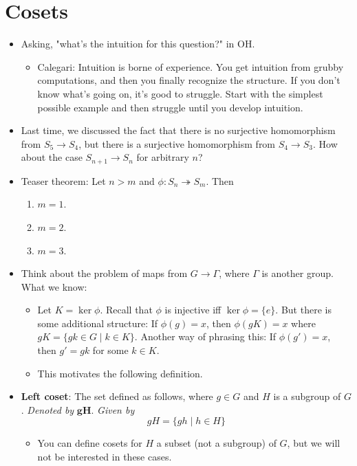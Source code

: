 \documentclass[../notes.tex]{subfiles}
\begin{document}
\section{Cosets}
\begin{itemize}
    \item {}Asking, "what's the intuition for this question?" in OH.
    \begin{itemize}
        \item Calegari: Intuition is borne of experience. You get intuition from grubby computations, and then you finally recognize the structure. If you don't know what's going on, it's good to struggle. Start with the simplest possible example and then struggle until you develop intuition.
    \end{itemize}
    \item Last time, we discussed the fact that there is no surjective homomorphism from $S_5\to S_4$, but there is a surjective homomorphism from $S_4\to S_3$. How about the case $S_{n+1}\to S_n$ for arbitrary $n$?
    \item Teaser theorem: Let $n>m$ and $\phi:S_n\twoheadrightarrow S_m$. Then
    \begin{enumerate}
        \item $m=1$.
        \item $m=2$.
        \item $m=3$.
    \end{enumerate}
    \item Think about the problem of maps from $G\to\Gamma$, where $\Gamma$ is another group. What we know:
    \begin{itemize}
        \item Let $K=\ker\phi$. Recall that $\phi$ is injective iff $\ker\phi=\{e\}$. But there is some additional structure: If $\phi(g)=x$, then $\phi(gK)=x$ where $gK=\{gk\in G\mid k\in K\}$. Another way of phrasing this: If $\phi(g')=x$, then $g'=gk$ for some $k\in K$.
        \item This motivates the following definition.
    \end{itemize}
    \item \textbf{Left coset}: The set defined as follows, where $g\in G$ and $H$ is a subgroup of $G$. \emph{Denoted by} $\bm{gH}$. \emph{Given by}
    \begin{equation*}
        gH = \{gh\mid h\in H\}
    \end{equation*}
    \begin{itemize}
        \item You can define cosets for $H$ a subset (not a subgroup) of $G$, but we will not be interested in these cases.

\end{itemize}
\end{itemize}
\end{document}

